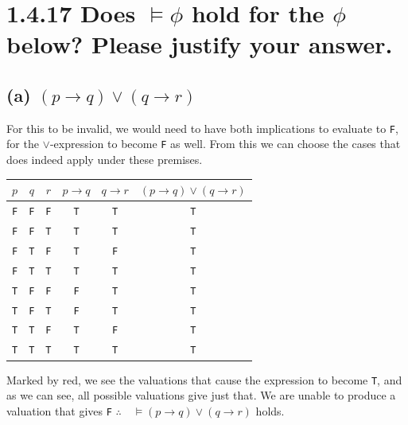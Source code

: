 \documentclass[11pt,a4paper]{article}
\let\imp\to
\begin{document}
\newpage
\section*{1.4.17 \mdseries Does $\models \phi$ hold for the $\phi$ below? Please justify your answer.}
\subsection*{(a) \mdseries $(p \imp q) \lor (q \imp r)$}
For this to be invalid, we would need to have both implications to evaluate to {\tt F}, for the $\lor$-expression to become {\tt F} as well. From this we can choose the cases that does indeed apply under these premises.
\begin{center}
	\begin{tabu}{ccccc|c}
		$p$ & $q$ & $r$ & $p \imp q$ & $q \imp r$ & $(p \imp q) \lor (q \imp r)$ \\ \hline
		\color{red} {\tt F} & \color{red} {\tt F} & \color{red} {\tt F} & \color{red} {\tt T} & \color{red} {\tt T} & \color{red} {\tt T} \\
		\color{red} {\tt F} & \color{red} {\tt F} & \color{red} {\tt T} & \color{red} {\tt T} & \color{red} {\tt T} & \color{red} {\tt T} \\
		\color{red} {\tt F} & \color{red} {\tt T} & {\tt F} & \color{red} {\tt T} & {\tt F} & \color{red} {\tt T} \\
		\color{red} {\tt F} & \color{red} {\tt T} & \color{red} {\tt T} & \color{red} {\tt T} & \color{red} {\tt T} & \color{red} {\tt T} \\
		{\tt T} & \color{red} {\tt F} & \color{red} {\tt F} & {\tt F} & \color{red} {\tt T} & \color{red} {\tt T} \\
		{\tt T} & \color{red} {\tt F} & \color{red} {\tt T} & {\tt F} & \color{red} {\tt T} & \color{red} {\tt T} \\
		\color{red} {\tt T} & \color{red} {\tt T} & {\tt F} & \color{red} {\tt T} & {\tt F} & \color{red} {\tt T} \\
		\color{red} {\tt T} & \color{red} {\tt T} & \color{red} {\tt T} & \color{red} {\tt T} & \color{red} {\tt T} & \color{red} {\tt T} \\
	\end{tabu}
\end{center}
Marked by red, we see the valuations that cause the expression to become {\tt T}, and as we can see, all possible valuations give just that. We are unable to produce a valuation that gives {\tt F} $\therefore\quad\models (p \imp q) \lor (q \imp r)$ holds. 
\end{document}
